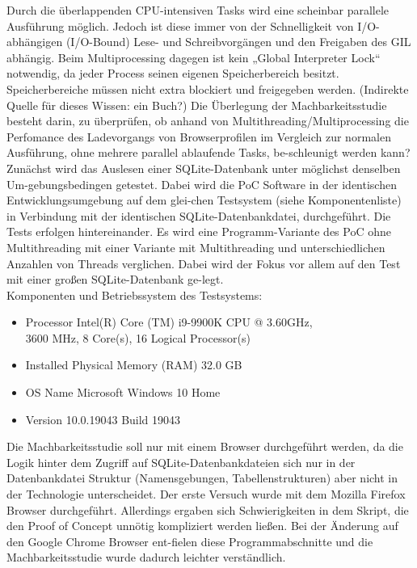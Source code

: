\documentclass[12pt]{article}
\begin{document}
Durch die überlappenden CPU-intensiven Tasks wird eine scheinbar parallele Ausführung möglich. Jedoch ist diese immer von der Schnelligkeit von I/O-abhängigen (I/O-Bound) Lese- und Schreibvorgängen und den Freigaben des GIL abhängig. 
Beim Multiprocessing dagegen ist kein „Global Interpreter Lock“ notwendig, da jeder Process seinen eigenen Speicherbereich besitzt. Speicherbereiche müssen nicht extra blockiert und freigegeben werden.
(Indirekte Quelle für dieses Wissen: ein Buch?)
Die Überlegung der Machbarkeitsstudie besteht darin, zu überprüfen, ob anhand von Multithreading/Multiprocessing die Perfomance des Ladevorgangs von Browserprofilen im Vergleich zur normalen Ausführung, ohne mehrere parallel ablaufende Tasks, be-schleunigt werden kann?
Zunächst wird das Auslesen einer SQLite-Datenbank unter möglichst denselben Um-gebungsbedingen getestet. 
Dabei wird die PoC Software in der identischen Entwicklungsumgebung auf dem glei-chen Testsystem (siehe Komponentenliste) in Verbindung mit der identischen SQLite-Datenbankdatei, durchgeführt. Die Tests erfolgen hintereinander.
Es wird eine Programm-Variante des PoC ohne Multithreading mit einer Variante mit Multithreading und unterschiedlichen Anzahlen von Threads verglichen. 
Dabei wird der Fokus vor allem auf den Test mit einer großen SQLite-Datenbank ge-legt.\\

Komponenten und Betriebssystem des Testsystems:
\begin{itemize}
	\item Processor	Intel(R) Core (TM) i9-9900K CPU @ 3.60GHz,\\
	3600 MHz, 8 Core(s), 16 Logical Processor(s)
	\item Installed Physical Memory (RAM)	32.0 GB
	\item OS Name	Microsoft Windows 10 Home
	\item Version	10.0.19043 Build 19043
\end{itemize}
	
Die Machbarkeitsstudie soll nur mit einem Browser durchgeführt werden, da die Logik hinter dem Zugriff auf SQLite-Datenbankdateien sich nur in der Datenbankdatei 
Struktur (Namensgebungen, Tabellenstrukturen) aber nicht in der Technologie unterscheidet. Der erste Versuch wurde mit dem Mozilla Firefox Browser durchgeführt. 
Allerdings ergaben sich Schwierigkeiten in dem Skript, die den Proof of Concept unnötig kompliziert werden ließen. Bei der Änderung auf den Google Chrome Browser ent-fielen diese Programmabschnitte und die Machbarkeitsstudie wurde dadurch leichter verständlich.
\end{document}
